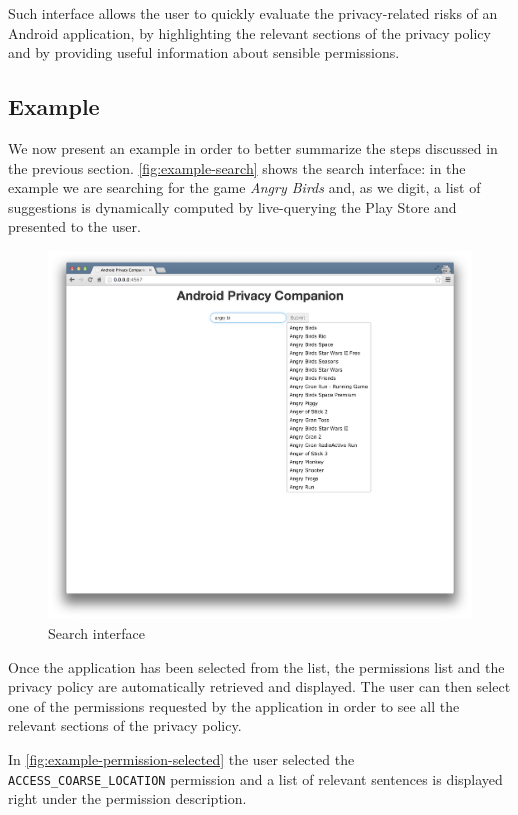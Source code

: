 \documentclass[twoside,letterpaper]{soups}
\theoremstyle{definition}
\begin{document}
Such interface allows the user to quickly evaluate the privacy-related risks of an Android application, by highlighting the relevant sections of the privacy policy and by providing useful information about sensible permissions.

\subsection{Example}
We now present an example in order to better summarize the steps discussed in the previous section.
\autoref{fig:example-search} shows the search interface: in the example we are searching for the game \emph{Angry Birds} and, as we digit, a list of suggestions is dynamically computed by live-querying the Play Store and presented to the user.

\begin{figure}[ht]
\centering
     \includegraphics[width=\linewidth]{images/example-search}
      \caption{Search interface}
      \label{fig:example-search}
\end{figure}

Once the application has been selected from the list, the permissions list and the privacy policy are automatically retrieved and displayed.
The user can then select one of the permissions requested by the application in order to see all the relevant sections of the privacy policy.

In \autoref{fig:example-permission-selected} the user selected the \texttt{ACCESS\_COARSE\_LOCATION} permission and a list of relevant sentences is displayed right under the permission description.
\end{document}
